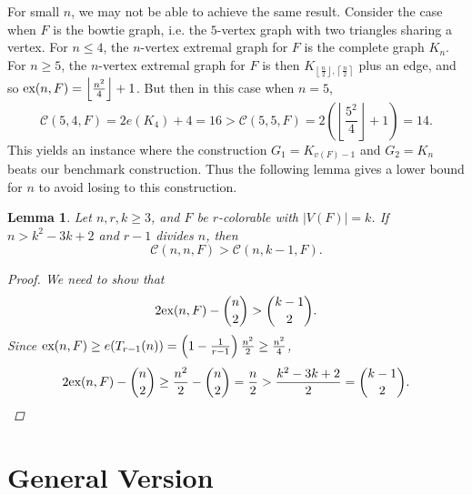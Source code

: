 \documentclass[10pt, reqno]{report}
\newtheorem{lemma}[theorem]{Lemma}
\newtheorem{corollary}[theorem]{Corollary}
\newcommand*{\ex}{\textnormal{ex}}
\newcommand*{\dex}{\textnormal{ex}_2}
\newcommand*{\con}{\mathcal{C}}
\begin{document}



For small $n$, we may not be able to achieve the same result. Consider the case when $F$ is the bowtie graph, i.e. the $5$-vertex graph with two triangles sharing a vertex. For $n \leq 4$, the $n$-vertex extremal graph for $F$ is the complete graph $K_n$. For $n \geq 5$, the $n$-vertex extremal graph for $F$ is then $K_{\left\lfloor\frac{n}{2}\right\rfloor, \left\lceil\frac{n}{2}\right\rceil}$ plus an edge, and so $\ex(n, F) = \left\lfloor\frac{n^2}{4}\right\rfloor + 1$. But then in this case when $n = 5$, 
\[
  \con(5, 4, F) = 2e(K_4) + 4 = 16 > \con(5, 5, F) = 2\left(\left\lfloor\frac{5^2}{4}\right\rfloor + 1\right) = 14.
\]
This yields an instance where the construction $G_1 = K_{v(F) - 1}$ and $G_2 = K_n$ beats our benchmark construction. Thus the following lemma gives a lower bound for $n$ to avoid losing to this construction.

\begin{lemma}
  Let $n, r, k \geq 3$, and $F$ be $r$-colorable with $|V(F)| = k$. If $n > k^2 - 3k + 2$ and $r - 1$ divides $n$, then 
  \[
    \con(n, n, F) > \con(n, k - 1, F).
  \]
  \begin{proof}
    We need to show that
    \[
      2\ex(n, F) - \binom{n}{2} > \binom{k - 1}{2}.
    \]
    Since $\ex(n, F) \geq e(T_{r - 1}(n)) = \left(1 - \frac{1}{r - 1}\right)\frac{n^2}{2} \geq \frac{n^2}{4}$,
    \[
      2\ex(n, F) - \binom{n}{2} \geq \frac{n^2}{2} - \binom{n}{2} = \frac{n}{2} > \frac{k^2 - 3k + 2}{2} = \binom{k - 1}{2}.
    \]
  \end{proof}
\end{lemma}

\chapter{General Version}
\end{document}

